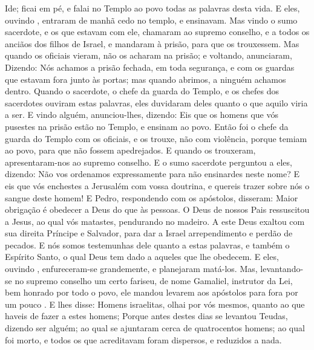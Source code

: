 {  Ide; ficai em pé, e falai no Templo ao povo todas as palavras desta vida.
  E eles, ouvindo
{},  entraram de manhã cedo no templo, e ensinavam. Mas vindo o sumo sacerdote, e os que estavam com ele, chamaram ao supremo conselho,
 e a todos os anciãos dos filhos de Israel, e mandaram à prisão, para que os trouxessem.
  Mas quando os oficiais vieram, não os acharam na prisão; e voltando, anunciaram,
  Dizendo: Nós achamos a prisão fechada, em toda segurança, e com os guardas que estavam fora junto às portas; mas quando
{} abrimos, a ninguém achamos dentro.
  Quando o
{} sacerdote, o chefe da guarda do Templo, e os chefes dos sacerdotes ouviram estas palavras, eles duvidaram deles quanto o que aquilo viria a ser.
  E vindo alguém, anunciou-lhes, dizendo: Eis que os homens que vós pusestes na prisão estão no Templo, e ensinam ao povo.
  Então foi o chefe da guarda do Templo com os oficiais, e os trouxe,
{} não com violência, porque temiam ao povo, para que não fossem apedrejados.
  E quando os trouxeram, apresentaram-nos ao supremo conselho. E o sumo sacerdote perguntou a eles, dizendo:
  Não vos ordenamos expressamente para não ensinardes
{} neste nome? E eis que vós enchestes a Jerusalém com vossa doutrina, e quereis trazer sobre nós o sangue deste homem!
  E Pedro, respondendo com os apóstolos, disseram: Maior obrigação é obedecer a Deus do que às pessoas.
  O Deus de nossos Pais ressuscitou a Jesus, ao qual vós matastes, pendurando
{} no madeiro.
  A este Deus exaltou com sua
{} direita
{} Príncipe e Salvador, para dar a Israel arrependimento e perdão de pecados.
  E nós somos testemunhas dele quanto a estas palavras, e também o Espírito Santo, o qual Deus tem dado a aqueles que lhe obedecem.
  E eles, ouvindo
{},  enfureceram-se grandemente, e planejaram matá-los.
  Mas, levantando-se no supremo conselho um certo fariseu, de nome Gamaliel, instrutor da Lei, bem honrado por todo o povo, ele mandou levarem aos apóstolos para fora por um pouco
{} .
  E lhes disse: Homens israelitas, olhai por vós mesmos, quanto ao que haveis de fazer a estes homens;
  Porque antes destes dias se levantou Teudas, dizendo ser alguém; ao qual se ajuntaram cerca de quatrocentos homens; ao qual foi morto, e todos os que acreditavam
{} foram dispersos, e reduzidos a nada.
}
